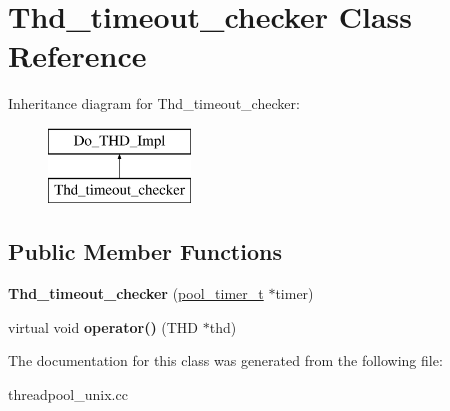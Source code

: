 \hypertarget{classThd__timeout__checker}{}\section{Thd\+\_\+timeout\+\_\+checker Class Reference}
\label{classThd__timeout__checker}
Inheritance diagram for Thd\+\_\+timeout\+\_\+checker\+:\begin{figure}[H]
\begin{center}
\leavevmode
\includegraphics[height=2.000000cm]{classThd__timeout__checker}
\end{center}
\end{figure}
\subsection*{Public Member Functions}
\begin{DoxyCompactItemize}
\item 
\mbox{\label{classThd__timeout__checker_a5256e8ec40c9d198645bfda2ddd92582}} 
{\bfseries Thd\+\_\+timeout\+\_\+checker} (\mbox{\hyperlink{structpool__timer__t}{pool\+\_\+timer\+\_\+t}} $\ast$timer)
\item 
\mbox{\label{classThd__timeout__checker_aa999616b2d18d516c14477d6ead7bdf3}} 
virtual void {\bfseries operator()} (T\+HD $\ast$thd)
\end{DoxyCompactItemize}


The documentation for this class was generated from the following file\+:\begin{DoxyCompactItemize}
\item 
threadpool\+\_\+unix.\+cc\end{DoxyCompactItemize}
